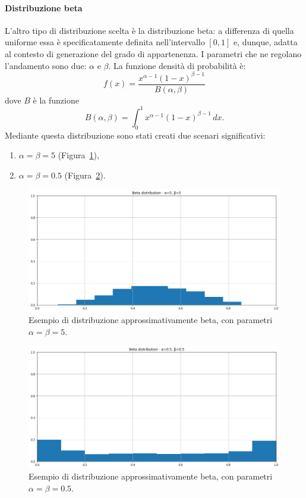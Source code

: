 \documentclass[12pt]{report}
\theoremstyle{definition}
\begin{document}
\paragraph{Distribuzione beta}
L'altro tipo di distribuzione scelta è la distribuzione beta: a differenza di quella uniforme essa è specificatamente definita nell'intervallo $[0,1]$ e, dunque, adatta al contesto di generazione del grado di appartenenza. I parametri che ne regolano l'andamento sono due: $\alpha$ e $\beta$. La funzione densità di probabilità è:
\begin{equation}
    f(x)= \frac{x^{\alpha - 1}(1-x)^{\beta - 1}}{B(\alpha, \beta)}
\end{equation}
dove $B$ è la funzione
\begin{equation}
    B(\alpha, \beta) = \int_{0}^{1} x^{\alpha - 1}(1-x)^{\beta - 1} \,dx.
\end{equation}
Mediante questa distribuzione sono stati creati due scenari significativi:
\begin{enumerate}
    \item $\alpha = \beta = 5$ (Figura~\ref{beta5}),
    \item $\alpha = \beta = 0.5$ (Figura~\ref{beta05}).
\end{enumerate}
\begin{figure}
    \centering
    \includegraphics[scale=0.4]{images/beta5.png}
    \caption{Esempio di distribuzione approssimativamente beta, con parametri $\alpha = \beta = 5$.}
    \label{beta5}
\end{figure}
\begin{figure}
    \centering
    \includegraphics[scale=0.4]{images/beta05.png}
    \caption{Esempio di distribuzione approssimativamente beta, con parametri $\alpha = \beta = 0.5$.}
    \label{beta05}
\end{figure}
\end{document}
